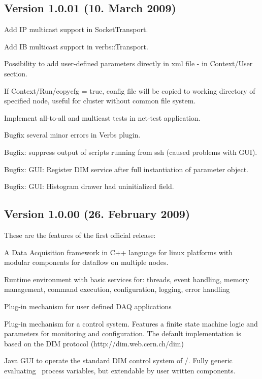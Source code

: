 \subsection{Version 1.0.01 (10. March 2009)} 
\bnum
\item Add IP multicast support in SocketTransport.
\item Add IB multicast support in verbs::Transport.
\item Possibility to add user-defined parameters directly in xml file - 
      in Context/User section.
\item If Context/Run/copycfg = true, config file will be copied to working
      directory of specified node, useful for cluster without common file system.
\item Implement all-to-all and multicast tests in net-test application.
\item Bugfix several minor errors in Verbs plugin.
\item Bugfix: suppress output of scripts running from ssh (caused problems with GUI).
\item Bugfix: GUI: Register DIM service after full instantiation of parameter object.
\item Bugfix: GUI: Histogram drawer had uninitialized field.
\enum

\subsection{Version 1.0.00 (26. February 2009)}
These are the features of the first official release:
\bnum
\item A Data Acquisition framework in C++ language for linux platforms
   with modular components for dataflow on multiple nodes.
   
\item Runtime environment with basic services for:
   threads, event handling, memory management, command execution, 
   configuration, logging, error handling

\item Plug-in mechanism for user defined DAQ applications

\item Plug-in mechanism for a control system. Features a finite state machine
   logic and parameters for monitoring and  configuration.
   The default implementation is based
   on the DIM protocol (http://dim.web.cern.ch/dim)

\item Java GUI to operate the standard DIM control system of \dabc/\mbs. 
   Fully generic evaluating \dabc\ process variables, but extendable
   by user written components.

